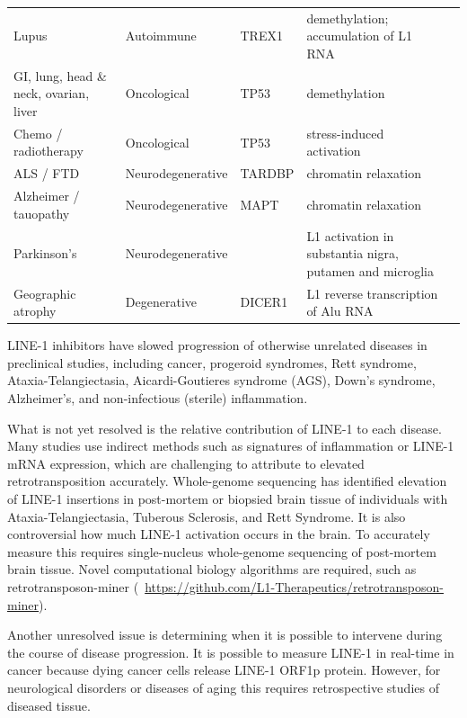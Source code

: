 \documentclass[11pt,twocolumn,twoside]{extarticle}
\begin{document}
\begin{table}[!t]
\begin{tabularx}{\textwidth}{@{}>{\RaggedRight\arraybackslash}p{2.7cm} >{\RaggedRight\arraybackslash}p{3.15cm} >{\RaggedRight\arraybackslash}p{2.05cm} Y l@{}}
Lupus & Autoimmune & TREX1 & demethylation; accumulation of L1 RNA & \cite{mavragani} \\
GI, lung, head \& neck, ovarian, liver & Oncological & TP53 & demethylation & \cite{rodriguez,gasior,zhang,mendez,rajurkar,mendez2} \\
Chemo / radiotherapy & Oncological & TP53 & stress-induced activation & \cite{rajurkar} \\
ALS / FTD & Neurodegenerative & TARDBP & chromatin relaxation & \cite{liu} \\
Alzheimer / tauopathy & Neurodegenerative & MAPT & chromatin relaxation & \cite{herdy} \\
Parkinson's & Neurodegenerative &  & L1 activation in substantia nigra, putamen and microglia & \cite{garza,gordillo} \\
Geographic atrophy & Degenerative & DICER1 & L1 reverse transcription of Alu RNA & \cite{fukuda} \\
\bottomrule
\end{tabularx}
\end{table}

LINE-1 inhibitors have slowed progression of otherwise unrelated diseases in preclinical studies, including cancer\cite{rajurkar,novototskaya}, progeroid syndromes\cite{simon,dellavalle}, Rett syndrome\cite{martins}, Ataxia-Telangiectasia\cite{takahashi}, Aicardi-Goutieres syndrome (AGS)\cite{thomas}, Down's syndrome\cite{martinez}, Alzheimer's\cite{herdy}, and non-infectious (sterile) inflammation\cite{cecco}.

What is not yet resolved is the relative contribution of LINE-1 to each disease. Many studies use indirect methods such as signatures of inflammation or LINE-1 mRNA expression, which are challenging to attribute to elevated retrotransposition accurately\cite{faulkner}. Whole-genome sequencing has identified elevation of LINE-1 insertions in post-mortem or biopsied brain tissue of individuals with Ataxia-Telangiectasia, Tuberous Sclerosis, and Rett Syndrome\cite{jacob}. It is also controversial how much LINE-1 activation occurs in the brain\cite{jacob,upton,erwin,evrony}. To accurately measure this requires single-nucleus whole-genome sequencing of post-mortem brain tissue. Novel computational biology algorithms are required, such as retrotransposon-miner (\href{https://github.com/L1-Therapeutics/retrotransposon-miner}{\faGithub}~\url{https://github.com/L1-Therapeutics/retrotransposon-miner}).

Another unresolved issue is determining when it is possible to intervene during the course of disease progression. It is possible to measure LINE-1 in real-time in cancer because dying cancer cells release LINE-1 ORF1p protein. However, for neurological disorders or diseases of aging this requires retrospective studies of diseased tissue.
\end{document}
